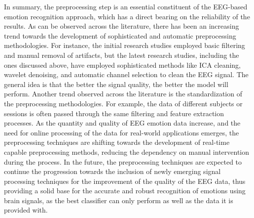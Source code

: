 \documentclass{WileyMSP-template}
\begin{document}
In summary, the preprocessing step is an essential constituent of the EEG-based emotion recognition approach, which has a direct bearing on the reliability of the results. As can be observed across the literature, there has been an increasing trend towards the development of sophisticated and automatic preprocessing methodologies. For instance, the initial research studies employed basic filtering and manual removal of artifacts, but the latest research studies, including the ones discussed above, have employed sophisticated methods like ICA cleaning, wavelet denoising, and automatic channel selection to clean the EEG signal. The general idea is that the better the signal quality, the better the model will perform. Another trend observed across the literature is the standardization of the preprocessing methodologies. For example, the data of different subjects or sessions is often passed through the same filtering and feature extraction processes. As the quantity and quality of EEG emotion data increase, and the need for online processing of the data for real-world applications emerges, the preprocessing techniques are shifting towards the development of real-time capable preprocessing methods, reducing the dependency on manual intervention during the process. In the future, the preprocessing techniques are expected to continue the progression towards the inclusion of newly emerging signal processing techniques for the improvement of the quality of the EEG data, thus providing a solid base for the accurate and robust recognition of emotions using brain signals, as the best classifier can only perform as well as the data it is provided with.
\end{document}
